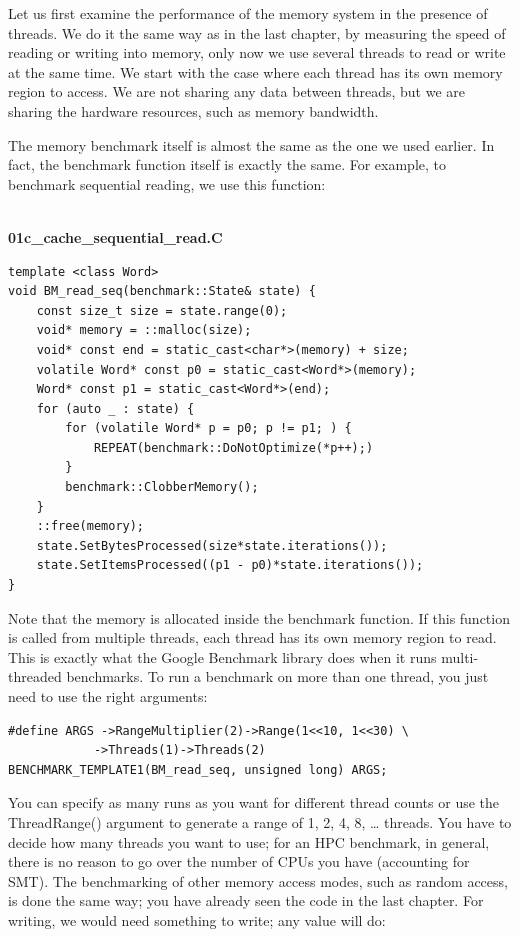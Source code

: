 Let us first examine the performance of the memory system in the presence of threads. We do it the same way as in the last chapter, by measuring the speed of reading or writing into memory, only now we use several threads to read or write at the same time. We start with the case where each thread has its own memory region to access. We are not sharing any data between threads, but we are sharing the hardware resources, such as memory bandwidth.

The memory benchmark itself is almost the same as the one we used earlier. In fact, the benchmark function itself is exactly the same. For example, to benchmark sequential reading, we use this function:

\hspace*{\fill} \\ %
\noindent
\textbf{01c\_cache\_sequential\_read.C}
\begin{lstlisting}[style=styleCXX]
template <class Word>
void BM_read_seq(benchmark::State& state) {
	const size_t size = state.range(0);
	void* memory = ::malloc(size);
	void* const end = static_cast<char*>(memory) + size;
	volatile Word* const p0 = static_cast<Word*>(memory);
	Word* const p1 = static_cast<Word*>(end);
	for (auto _ : state) {
		for (volatile Word* p = p0; p != p1; ) {
			REPEAT(benchmark::DoNotOptimize(*p++);)
		}
		benchmark::ClobberMemory();
	}
	::free(memory);
	state.SetBytesProcessed(size*state.iterations());
	state.SetItemsProcessed((p1 - p0)*state.iterations());
}
\end{lstlisting}

Note that the memory is allocated inside the benchmark function. If this function is called from multiple threads, each thread has its own memory region to read. This is exactly what the Google Benchmark library does when it runs multi-threaded benchmarks. To run a benchmark on more than one thread, you just need to use the right arguments:

\begin{lstlisting}[style=styleCXX]
#define ARGS ->RangeMultiplier(2)->Range(1<<10, 1<<30) \
			->Threads(1)->Threads(2)
BENCHMARK_TEMPLATE1(BM_read_seq, unsigned long) ARGS;
\end{lstlisting}


You can specify as many runs as you want for different thread counts or use the ThreadRange() argument to generate a range of 1, 2, 4, 8, … threads. You have to decide how many threads you want to use; for an HPC benchmark, in general, there is no reason to go over the number of CPUs you have (accounting for SMT). The benchmarking of other memory access modes, such as random access, is done the same way; you have already seen the code in the last chapter. For writing, we would need something to write; any value will do:

